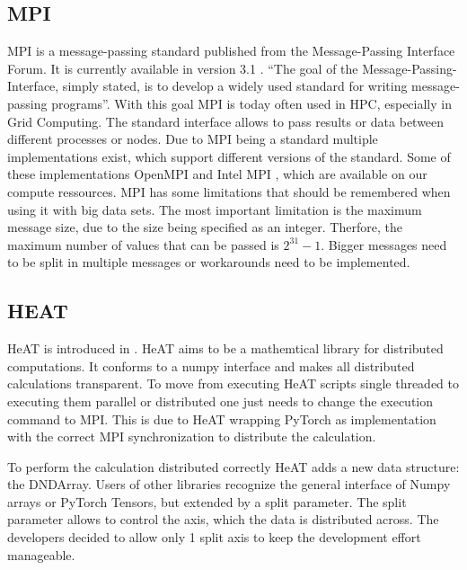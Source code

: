 \subsection{MPI}
\label{subec:mpi}
\gls{MPI} is a message-passing standard published from the Message-Passing Interface Forum. It is currently available in version 3.1 \cite{message_passing_interface_forum_mpi_2015}.
\enquote{The goal of the Message-Passing-Interface, simply stated, is to develop a widely used standard for writing message-passing programs}\cite{message_passing_interface_forum_mpi_2015}.
With this goal \gls{MPI} is today often used in \gls{HPC}, especially in Grid Computing. The standard interface allows to pass results or data between different processes or nodes.
Due to \gls{MPI} being a standard multiple implementations exist, which support different versions of the standard.
Some of these implementations OpenMPI \cite{noauthor_open_nodate} and Intel MPI \cite{noauthor_intel_nodate}, which are available on our compute ressources.
\gls{MPI} has some limitations that should be remembered when using it with big data sets. The most important limitation is the maximum message size, due to the size
being specified as an integer. Therfore, the maximum number of values that can be passed is \(2^{31} - 1\). Bigger messages need to be split in multiple messages or workarounds need to be implemented.

\subsection{HEAT}
\label{subsec:heat}
\gls{HeAT} is introduced in \cite{krajsek_helmholtz_nodate}. \gls{HeAT} aims to be a mathemtical library for distributed computations.
It conforms to a \gls{numpy} \cite{noauthor_numpy_nodate} interface and makes all distributed calculations transparent. To move from executing \gls{HeAT} scripts single threaded to executing them parallel
or distributed one just needs to change the execution command to \gls{MPI}.
This is due to \gls{HeAT} wrapping \gls{PyTorch} as implementation with the correct \gls{MPI} synchronization to distribute the calculation.

To perform the calculation distributed correctly \gls{HeAT} adds a new data structure: the DNDArray. Users of other libraries
recognize the general interface of Numpy arrays or PyTorch Tensors, but extended by a split parameter.
The split parameter allows to control the axis, which the data is distributed across.
The developers decided to allow only 1 split axis to keep the development effort manageable.

